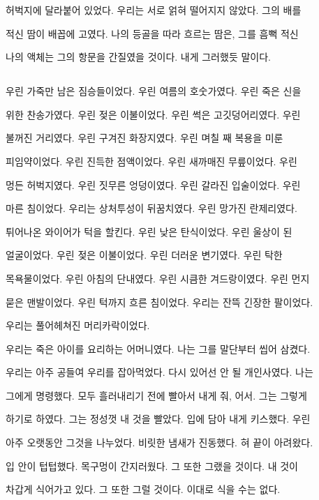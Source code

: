 허벅지에 달라붙어 있었다. 우리는 서로 얽혀 떨어지지 않았다. 그의 배를

적신 땀이 배꼽에 고였다. 나의 등골을 따라 흐르는 땀은, 그를 흠뻑 적신

나의 액체는 그의 항문을 간질였을 것이다. 내게 그러했듯 말이다.



\hypertarget{section-1}{%

\subsection{}\label{section-1}}



우린 가죽만 남은 짐승들이었다. 우린 여름의 호숫가였다. 우린 죽은 신을

위한 찬송가였다. 우린 젖은 이불이었다. 우린 썩은 고깃덩어리였다. 우린

불꺼진 거리였다. 우린 구겨진 화장지였다. 우린 며칠 째 복용을 미룬

피임약이었다. 우린 진득한 점액이었다. 우린 새까매진 무릎이었다. 우린

멍든 허벅지였다. 우린 짓무른 엉덩이였다. 우린 갈라진 입술이었다. 우린

마른 침이었다. 우리는 상처투성이 뒤꿈치였다. 우린 망가진 란제리였다.

튀어나온 와이어가 턱을 할킨다. 우린 낮은 탄식이었다. 우린 울상이 된

얼굴이었다. 우린 젖은 이불이었다. 우린 더러운 변기였다. 우린 탁한

목욕물이었다. 우린 아침의 단내였다. 우린 시큼한 겨드랑이였다. 우린 먼지

묻은 맨발이었다. 우린 턱까지 흐른 침이었다. 우리는 잔뜩 긴장한 팔이었다.

우리는 풀어헤쳐진 머리카락이었다.



우리는 죽은 아이를 요리하는 어머니였다. 나는 그를 말단부터 씹어 삼켰다.

우리는 아주 공들여 우리를 잡아먹었다. 다시 있어선 안 될 개인사였다. 나는

그에게 명령했다. 모두 흘러내리기 전에 빨아서 내게 줘, 어서. 그는 그렇게

하기로 하였다. 그는 정성껏 내 것을 빨았다. 입에 담아 내게 키스했다. 우린

아주 오랫동안 그것을 나누었다. 비릿한 냄새가 진동했다. 혀 끝이 아려왔다.

입 안이 텁텁했다. 목구멍이 간지러웠다. 그 또한 그랬을 것이다. 내 것이

차갑게 식어가고 있다. 그 또한 그럴 것이다. 이대로 식을 수는 없다.

